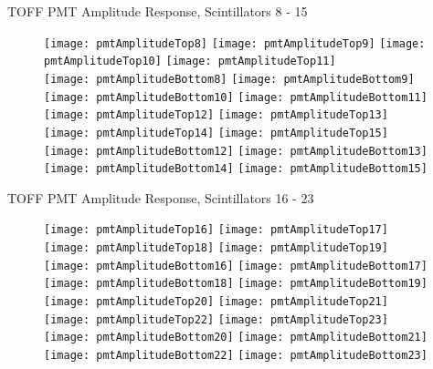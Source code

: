 \documentclass[11pt]{beamer}
\begin{document}
\begin{frame}{TOFF PMT Amplitude Response, Scintillators 8 - 15}
\begin{figure}
\centering
\texttt{[image: pmtAmplitudeTop8]}
\texttt{[image: pmtAmplitudeTop9]}
\texttt{[image: pmtAmplitudeTop10]}
\texttt{[image: pmtAmplitudeTop11]} \\ 
\texttt{[image: pmtAmplitudeBottom8]}
\texttt{[image: pmtAmplitudeBottom9]}
\texttt{[image: pmtAmplitudeBottom10]}
\texttt{[image: pmtAmplitudeBottom11]} \\
\texttt{[image: pmtAmplitudeTop12]}
\texttt{[image: pmtAmplitudeTop13]}
\texttt{[image: pmtAmplitudeTop14]}
\texttt{[image: pmtAmplitudeTop15]} \\
\texttt{[image: pmtAmplitudeBottom12]}
\texttt{[image: pmtAmplitudeBottom13]}
\texttt{[image: pmtAmplitudeBottom14]}
\texttt{[image: pmtAmplitudeBottom15]} \\
\end{figure}
\end{frame}

\begin{frame}{TOFF PMT Amplitude Response, Scintillators 16 - 23}
\begin{figure}
\centering
\texttt{[image: pmtAmplitudeTop16]}
\texttt{[image: pmtAmplitudeTop17]}
\texttt{[image: pmtAmplitudeTop18]}
\texttt{[image: pmtAmplitudeTop19]} \\ 
\texttt{[image: pmtAmplitudeBottom16]}
\texttt{[image: pmtAmplitudeBottom17]}
\texttt{[image: pmtAmplitudeBottom18]}
\texttt{[image: pmtAmplitudeBottom19]} \\
\texttt{[image: pmtAmplitudeTop20]}
\texttt{[image: pmtAmplitudeTop21]}
\texttt{[image: pmtAmplitudeTop22]}
\texttt{[image: pmtAmplitudeTop23]} \\
\texttt{[image: pmtAmplitudeBottom20]}
\texttt{[image: pmtAmplitudeBottom21]}
\texttt{[image: pmtAmplitudeBottom22]}
\texttt{[image: pmtAmplitudeBottom23]} \\
\end{figure}
\end{frame}
\end{document}
